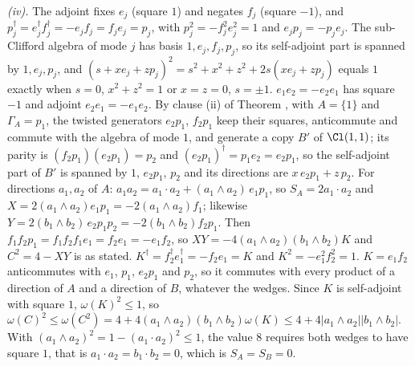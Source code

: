 \emph{(iv).} The adjoint fixes $e_{j}$ (square $1$) and negates $f_{j}$ (square $-1$), and $p_{j}^{\dagger} = e_{j}^{\dagger}f_{j}^{\dagger} = -e_{j}f_{j} = f_{j}e_{j} = p_{j}$, with $p_{j}^{2} = -f_{j}^{2}e_{j}^{2} = 1$ and $e_{j}p_{j} = -p_{j}e_{j}$. The sub-Clifford algebra of mode $j$ has basis $1, e_{j}, f_{j}, p_{j}$, so its self-adjoint part is spanned by $1, e_{j}, p_{j}$, and $(s + xe_{j} + zp_{j})^{2} = s^{2} + x^{2} + z^{2} + 2s(xe_{j} + zp_{j})$ equals $1$ exactly when $s = 0$, $x^{2} + z^{2} = 1$ or $x = z = 0$, $s = \pm 1$. $e_{1}e_{2} = -e_{2}e_{1}$ has square $-1$ and adjoint $e_{2}e_{1} = -e_{1}e_{2}$. By clause (ii) of Theorem , with $A = \{1\}$ and $\Gamma_{A} = p_{1}$, the twisted generators $e_{2}p_{1}$, $f_{2}p_{1}$ keep their squares, anticommute and commute with the algebra of mode $1$, and generate a copy $B'$ of $\Cl(1,1)$; its parity is $(f_{2}p_{1})(e_{2}p_{1}) = p_{2}$ and $(e_{2}p_{1})^{\dagger} = p_{1}e_{2} = e_{2}p_{1}$, so the self-adjoint part of $B'$ is spanned by $1$, $e_{2}p_{1}$, $p_{2}$ and its directions are $x\,e_{2}p_{1} + z\,p_{2}$. For directions $a_{1}, a_{2}$ of $A$: $a_{1}a_{2} = a_{1} \cdot a_{2} + (a_{1} \wedge a_{2})\,e_{1}p_{1}$, so $S_{A} = 2a_{1} \cdot a_{2}$ and $X = 2(a_{1} \wedge a_{2})e_{1}p_{1} = -2(a_{1} \wedge a_{2})f_{1}$; likewise $Y = 2(b_{1} \wedge b_{2})\,e_{2}p_{1}p_{2} = -2(b_{1} \wedge b_{2})f_{2}p_{1}$. Then $f_{1}f_{2}p_{1} = f_{1}f_{2}f_{1}e_{1} = f_{2}e_{1} = -e_{1}f_{2}$, so $XY = -4(a_{1} \wedge a_{2})(b_{1} \wedge b_{2})K$ and $C^{2} = 4 - XY$ is as stated. $K^{\dagger} = f_{2}^{\dagger}e_{1}^{\dagger} = -f_{2}e_{1} = K$ and $K^{2} = -e_{1}^{2}f_{2}^{2} = 1$. $K = e_{1}f_{2}$ anticommutes with $e_{1}$, $p_{1}$, $e_{2}p_{1}$ and $p_{2}$, so it commutes with every product of a direction of $A$ and a direction of $B$, whatever the wedges. Since $K$ is self-adjoint with square $1$, $\omega(K)^{2} \le 1$, so $\omega(C)^{2} \le \omega(C^{2}) = 4 + 4(a_{1} \wedge a_{2})(b_{1} \wedge b_{2})\omega(K) \le 4 + 4|a_{1} \wedge a_{2}||b_{1} \wedge b_{2}|$. With $(a_{1} \wedge a_{2})^{2} = 1 - (a_{1} \cdot a_{2})^{2} \le 1$, the value $8$ requires both wedges to have square $1$, that is $a_{1} \cdot a_{2} = b_{1} \cdot b_{2} = 0$, which is $S_{A} = S_{B} = 0$.

